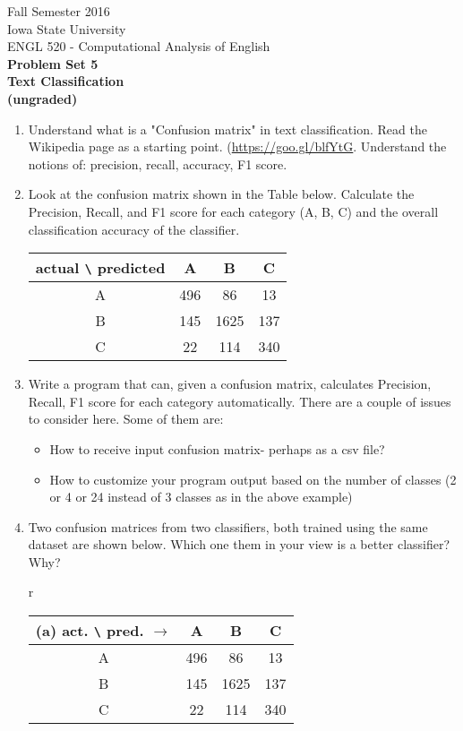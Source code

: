 \documentclass[11pt,a4paper]{article}
\begin{document}
\begin{center}
  Fall Semester 2016 \\ Iowa State University\\[3ex]
  {\large ENGL 520 - Computational Analysis of English}\\[3ex]
  \textbf{Problem Set 5} \\ \textbf{Text Classification\\ (ungraded)}
\end{center}


\begin{enumerate}
\item Understand what is a "Confusion matrix" in text classification. Read the Wikipedia page as a starting point. (\url{https://goo.gl/blfYtG}. Understand the notions of: precision, recall, accuracy, F1 score.
\item Look at the confusion matrix shown in the Table below. Calculate the Precision, Recall, and F1 score for each category (A, B, C) and the overall classification accuracy of the classifier. \\
\begin{tabular}{c|ccc}
\hline actual \texttt{\textbackslash} predicted &A&B&C \\
\hline A & 496 & 86 & 13\\
  B & 145 & 1625 & 137\\
  C & 22 & 114 & 340 \\
\hline
\end{tabular}
\item Write a program that can, given a confusion matrix, calculates Precision, Recall, F1 score for each category automatically. There are a couple of issues to consider here. Some of them are: 
\begin{itemize}
\item How to receive input confusion matrix- perhaps as a csv file?
\item How to customize your program output based on the number of classes (2 or 4 or 24 instead of 3 classes as in the above example)
\end{itemize}
\item Two confusion matrices from two classifiers, both trained using the same dataset are shown below. Which one them in your view is a better classifier? Why? 
\begin{table}[h]
\begin{center}
\begin{tabular}{r}
  \begin{tabular}{c|ccc}
    \hline
    (a) act. \texttt{\textbackslash} pred. $\rightarrow$&\textbf{A}&\textbf{B}&\textbf{C}\\
  \hline A & 496 & 86 & 13\\
  B & 145 & 1625 & 137\\
  C & 22 & 114 & 340 \\
\hline
  \end{tabular}


\end{tabular}
\end{center}
\end{table}
\end{enumerate}
\end{document}
